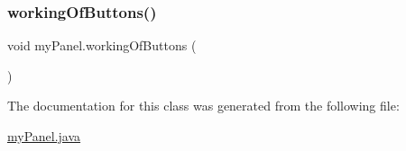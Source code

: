 \hypertarget{classmy_panel_ac67bebd824b15236aa5213673cd49c88}{}\label{classmy_panel_ac67bebd824b15236aa5213673cd49c88} 
\subsubsection{\texorpdfstring{working\+Of\+Buttons()}{workingOfButtons()}}
{\footnotesize\ttfamily void my\+Panel.\+working\+Of\+Buttons (\begin{DoxyParamCaption}{ }\end{DoxyParamCaption})}



The documentation for this class was generated from the following file\+:\begin{DoxyCompactItemize}
\item 
\hyperlink{my_panel_8java}{my\+Panel.\+java}\end{DoxyCompactItemize}
